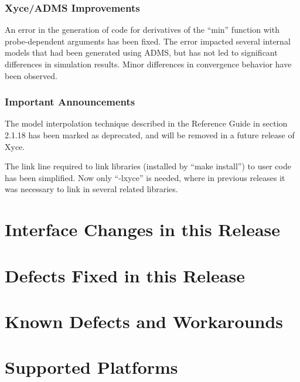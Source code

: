 \documentclass[letterpaper]{scrartcl}
\begin{document}
\subsubsection*{Xyce/ADMS Improvements}
\begin{XyceItemize}
  \item An error in the generation of code for derivatives of the
    ``min'' function with probe-dependent arguments has been fixed.
    The error impacted several internal models that had been generated
    using ADMS, but has not led to significant differences in
    simulation results.  Minor differences in convergence behavior
    have been observed.
\end{XyceItemize}

\subsubsection*{Important Announcements}
\begin{XyceItemize}
\item The model interpolation technique described in the \Xyce{}
  Reference Guide in section 2.1.18 has been marked as deprecated, and
  will be removed in a future release of Xyce.
\item The link line required to link \Xyce{} libraries (installed by
  ``make install'') to user code has been simplified.  Now only
  ``-lxyce'' is needed, where in previous releases it was necessary to
  link in several related libraries.
\end{XyceItemize}

\newpage
\section{Interface Changes in this Release}


\newpage
\section{Defects Fixed in this Release}


\newpage
\section{Known Defects and Workarounds}


\newpage
\section{Supported Platforms}
\end{document}
